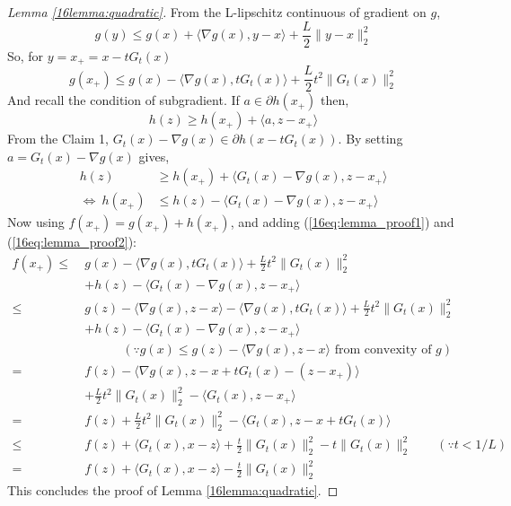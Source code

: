 \documentclass[12pt]{report}
\begin{document}
\begin{proof}[Lemma \ref{16lemma:quadratic}]
From the L-lipschitz continuous of gradient on $g$,
\begin{equation*}
g(y) \leq g(x) + \langle \nabla g(x),y-x \rangle +\frac{L}{2}\|y-x\|_2^2
\end{equation*}
So, for $y=x_+=x-tG_t(x)$
\begin{equation}\label{16eq:lemma_proof1}
g(x_+) \leq g(x)- \langle \nabla g(x), tG_t(x) \rangle +\frac{L}{2}t^2 \|G_t(x)\|_2^2
\end{equation}
And recall the condition of subgradient. If $a \in \partial h(x_+)$ then,
\begin{equation*}
h(z) \geq h(x_+)+\langle a,z-x_+ \rangle
\end{equation*}
From the Claim 1, $G_t(x)-\nabla g(x) \in \partial h(x-tG_t(x))$. By setting $a=G_t(x)-\nabla g(x)$ gives,
\begin{align}
h(z) &\geq h(x_+) + \langle G_t(x) -\nabla g(x),z-x_+ \rangle \nonumber\\
\Leftrightarrow ~h(x_+)&\leq h(z)-\langle G_t(x) -\nabla g(x),z-x_+ \rangle
\label{16eq:lemma_proof2}
\end{align}
Now using $f(x_+)=g(x_+)+h(x_+)$, and adding (\ref{16eq:lemma_proof1}) and (\ref{16eq:lemma_proof2}):
\begin{align*}
f(x_+) \leq ~&g(x)- \langle \nabla g(x), tG_t(x) \rangle +\frac{L}{2}t^2 \|G_t(x)\|_2^2\\
&+h(z)-\langle G_t(x) -\nabla g(x),z-x_+ \rangle\\
\leq ~&g(z) -\langle \nabla g(x),z-x \rangle - \langle \nabla g(x), tG_t(x) \rangle +\frac{L}{2}t^2 \|G_t(x)\|_2^2\\
&+h(z)-\langle G_t(x) -\nabla g(x),z-x_+ \rangle \\
&\hspace{3em}(\because g(x) \leq g(z)-\langle \nabla g(x),z-x \rangle \text{ from convexity of } g)\\
= ~&f(z)-\langle \nabla g(x),z-x+tG_t(x)-(z-x_+) \rangle\\
&+\frac{L}{2}t^2 \|G_t(x)\|_2^2 - \langle G_t(x),z-x_+ \rangle\\
= ~&f(z)+\frac{L}{2}t^2 \|G_t(x)\|_2^2 - \langle G_t(x),z-x+tG_t(x) \rangle\\
\leq ~&f(z)+\langle G_t (x),x-z \rangle+\frac{t}{2}\|G_t(x)\|_2^2-t \|G_t(x)\|_2^2 \hspace{2em}(\because t<1/L)\\
= ~&f(z)+\langle G_t (x),x-z \rangle-\frac{t}{2}\|G_t(x)\|_2^2
\end{align*}
This concludes the proof of Lemma \ref{16lemma:quadratic}.
\end{proof}
\end{document}
